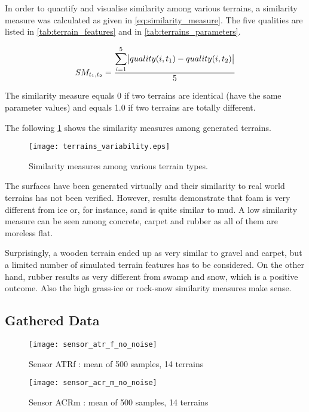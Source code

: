 In order to quantify and visualise similarity among various terrains, a similarity measure was calculated as given in \cref{eq:similarity_measure}. The five qualities are listed in \cref{tab:terrain_features} and in \cref{tab:terrains_parameters}.

\begin{align} \label{eq:similarity_measure}
  SM_{t_1, t_2} = \frac{\displaystyle\sum_{i=1}^{5} \abs{quality(i, t_1) - quality(i, t_2)}}{5}
\end{align} 

The similarity measure equals 0 if two terrains are identical (have the same parameter values) and equals 1.0 if two terrains are totally different.

The following \cref{fig:terrain_similarity_measures} shows the similarity measures among generated terrains.

\begin{figure}[H]
  \centering
  \texttt{[image: terrains\_variability.eps]}
  \caption{Similarity measures among various terrain types.}
  \label{fig:terrain_similarity_measures}
\end{figure}

The surfaces have been generated virtually and their similarity to real world terrains has not been verified. However, results demonstrate that foam is very different from ice or, for instance, sand is quite similar to mud. A low similarity measure can be seen among concrete, carpet and rubber as all of them are moreless flat.

Surprisingly, a wooden terrain ended up as very similar to gravel and carpet, but a limited number of simulated terrain features has to be considered. 
On the other hand, rubber results as very different from swamp and snow, which is a positive outcome. Also the high grass-ice or rock-snow similarity measures make sense. 

\subsection{Gathered Data} \label{ssec:gathered_data}

\begin{figure}[H]
  \centering
  \texttt{[image: sensor\_atr\_f\_no\_noise]}
  \caption{Sensor ATRf : mean of 500 samples, 14 terrains}
  \label{fig:sensor_atr_f_no_noise}
\end{figure}

\begin{figure}[H]
  \centering
  \texttt{[image: sensor\_acr\_m\_no\_noise]}
  \caption{Sensor ACRm : mean of 500 samples, 14 terrains}
  \label{fig:sensor_acr_m_no_noise}
\end{figure}

